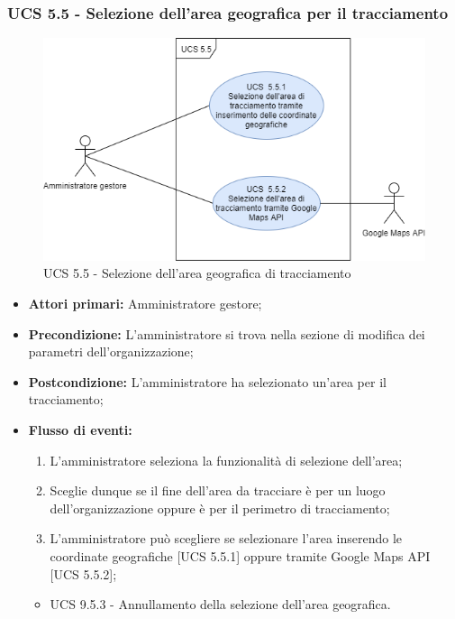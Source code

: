 \subsubsection{UCS 5.5 - Selezione dell'area geografica per il tracciamento}%
\begin{figure}[h]
	\centering
    \includegraphics[scale=0.53]{sezioni/UseCase/Immagini/UCS5.5.png}
    \caption{UCS 5.5 - Selezione dell'area geografica di tracciamento}
\end{figure}
\begin{itemize}
\item \textbf{Attori primari:} Amministratore gestore;
\item \textbf{Precondizione:} L'amministratore si trova nella sezione di modifica dei parametri dell'organizzazione;
\item \textbf{Postcondizione:} L'amministratore ha selezionato un'area per il tracciamento;
\item \textbf{Flusso di eventi:}
\begin{enumerate}
    \item L'amministratore seleziona la funzionalità di selezione dell'area;
    \item Sceglie dunque se il fine dell'area da tracciare è per un luogo dell'organizzazione oppure è per il perimetro di tracciamento;
    \item L'amministratore può scegliere se selezionare l'area inserendo le coordinate geografiche [UCS 5.5.1] oppure tramite Google Maps API [UCS 5.5.2];
\end{enumerate}
\begin{itemize}
    \item UCS 9.5.3 - Annullamento della selezione dell'area geografica.
\end{itemize}
\end{itemize}

